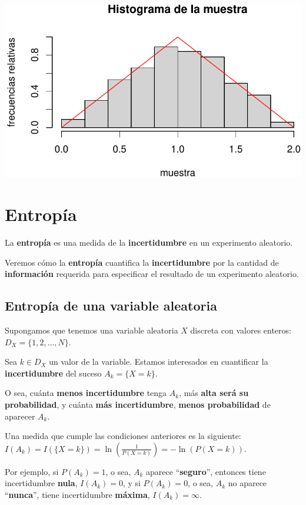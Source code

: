 \documentclass[
  letterpaper,
  DIV=11,
  numbers=noendperiod]{scrreprt}
\begin{document}
\includegraphics{4_files/figure-pdf/unnamed-chunk-12-1.pdf}

\hypertarget{entropuxeda}{%
\section{Entropía}\label{entropuxeda}}

La \textbf{entropía} es una medida de la \textbf{incertidumbre} en un
experimento aleatorio.

Veremos cómo la \textbf{entropía} cuantifica la \textbf{incertidumbre}
por la cantidad de \textbf{información} requerida para especificar el
resultado de un experimento aleatorio.

\hypertarget{entropuxeda-de-una-variable-aleatoria}{%
\subsection{Entropía de una variable
aleatoria}\label{entropuxeda-de-una-variable-aleatoria}}

Supongamos que tenemos una variable aleatoria \(X\) discreta con valores
enteros: \(D_X=\{1,2,\ldots,N\}\).

Sea \(k\in D_X\) un valor de la variable. Estamos interesados en
cuantificar la \textbf{incertidumbre} del suceso \(A_k =\{X=k\}\).

O sea, cuánta \textbf{menos incertidumbre} tenga \(A_k\), más
\textbf{alta será su probabilidad}, y cuánta \textbf{más incertidumbre},
\textbf{menos probabilidad} de aparecer \(A_k\).

Una medida que cumple las condiciones anteriores es la siguiente:
\(I(A_k)=I(\{X=k\})=\ln\left(\frac{1}{P(X=k)}\right)=-\ln\left(P(X=k)\right).\)

Por ejemplo, si \(P(A_k)=1\), o sea, \(A_k\) aparece
``\textbf{seguro}'', entonces tiene incertidumbre \textbf{nula},
\(I(A_k)=0\), y si \(P(A_k)=0\), o sea, \(A_k\) no aparece
``\textbf{nunca}'', tiene incertidumbre \textbf{máxima},
\(I(A_k)=\infty\).
\end{document}
